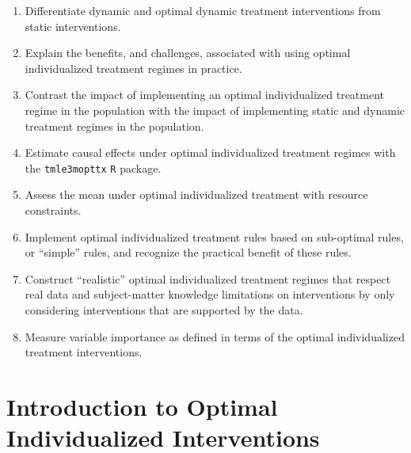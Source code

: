 \documentclass[
  12pt, krantz2,
]{krantz}
\newcommand{\passthrough}[1]{#1}
\providecommand{\tightlist}{%
  \setlength{\itemsep}{0pt}\setlength{\parskip}{0pt}}
\theoremstyle{definition}
\theoremstyle{definition}
\theoremstyle{definition}
\newcommand{\1}{\mathbbm{1}}
\begin{document}
\begin{enumerate}
\def\labelenumi{\arabic{enumi}.}
\tightlist
\item
  Differentiate dynamic and optimal dynamic treatment interventions from static
  interventions.
\item
  Explain the benefits, and challenges, associated with using optimal
  individualized treatment regimes in practice.
\item
  Contrast the impact of implementing an optimal individualized treatment
  regime in the population with the impact of implementing static and dynamic
  treatment regimes in the population.
\item
  Estimate causal effects under optimal individualized treatment regimes with
  the \passthrough{\lstinline!tmle3mopttx!} \passthrough{\lstinline!R!} package.
\item
  Assess the mean under optimal individualized treatment with resource
  constraints.
\item
  Implement optimal individualized treatment rules based on sub-optimal
  rules, or ``simple'' rules, and recognize the practical benefit of these rules.
\item
  Construct ``realistic'' optimal individualized treatment regimes that respect
  real data and subject-matter knowledge limitations on interventions by
  only considering interventions that are supported by the data.
\item
  Measure variable importance as defined in terms of the optimal individualized
  treatment interventions.
\end{enumerate}

\hypertarget{introduction-to-optimal-individualized-interventions}{%
\section{Introduction to Optimal Individualized Interventions}\label{introduction-to-optimal-individualized-interventions}}
\end{document}
